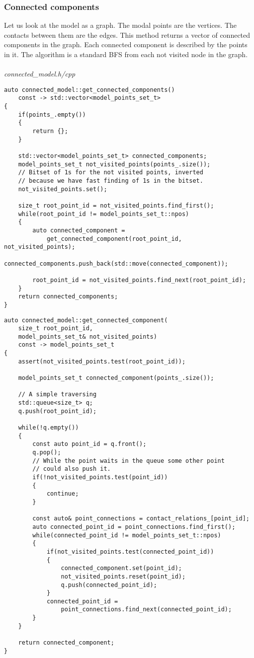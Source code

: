 \documentclass{article}
\begin{document}
	\newpage
	\subsubsection*{Connected components}
	Let us look at the model as a graph. The modal points are the vertices. The contacts between them are the edges. This method returns a vector of connected components in the graph. Each connected component is described by the points in it. The algorithm is a standard BFS from each not visited node in the graph.
\\
\\
\noindent
\textit{connected\_model.h/cpp}
\begin{lstlisting}
auto connected_model::get_connected_components()
	const -> std::vector<model_points_set_t>
{
    if(points_.empty())
    {
        return {};
    }

    std::vector<model_points_set_t> connected_components;
    model_points_set_t not_visited_points(points_.size());
    // Bitset of 1s for the not visited points, inverted
    // because we have fast finding of 1s in the bitset.
    not_visited_points.set();

    size_t root_point_id = not_visited_points.find_first();
    while(root_point_id != model_points_set_t::npos)
    {
        auto connected_component =
            get_connected_component(root_point_id, not_visited_points);
        connected_components.push_back(std::move(connected_component));

        root_point_id = not_visited_points.find_next(root_point_id);
    }
    return connected_components;
}
\end{lstlisting}
\newpage
\begin{lstlisting}
auto connected_model::get_connected_component(
	size_t root_point_id,
	model_points_set_t& not_visited_points)
	const -> model_points_set_t
{
    assert(not_visited_points.test(root_point_id));

    model_points_set_t connected_component(points_.size());

    // A simple traversing
    std::queue<size_t> q;
    q.push(root_point_id);

    while(!q.empty())
    {
        const auto point_id = q.front();
        q.pop();
        // While the point waits in the queue some other point
        // could also push it.
        if(!not_visited_points.test(point_id))
        {
            continue;
        }

        const auto& point_connections = contact_relations_[point_id];
        auto connected_point_id = point_connections.find_first();
        while(connected_point_id != model_points_set_t::npos)
        {
            if(not_visited_points.test(connected_point_id))
            {
                connected_component.set(point_id);
                not_visited_points.reset(point_id);
                q.push(connected_point_id);
            }
            connected_point_id =
                point_connections.find_next(connected_point_id);
        }
    }

    return connected_component;
}
\end{lstlisting}
\end{document}

